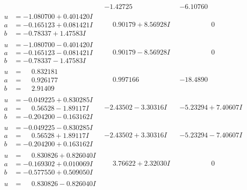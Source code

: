 \documentclass[1p]{elsarticle_modified}
\theoremstyle{definition}
\begin{document}
$$\begin{array}{c|c|c}
 & -1.42725\phantom{ +0.000000I} & -6.10760\phantom{ +0.000000I} \\ \hline\begin{aligned}
u &= -1.080700 + 0.401420 I \\
a &= -0.165123 + 0.081421 I \\
b &= -0.78337 + 1.47583 I\end{aligned}
 & \phantom{-}0.90179 + 8.56928 I & \phantom{-0.000000 } 0 \\ \hline\begin{aligned}
u &= -1.080700 - 0.401420 I \\
a &= -0.165123 - 0.081421 I \\
b &= -0.78337 - 1.47583 I\end{aligned}
 & \phantom{-}0.90179 - 8.56928 I & \phantom{-0.000000 } 0 \\ \hline\begin{aligned}
u &= \phantom{-}0.832181\phantom{ +0.000000I} \\
a &= \phantom{-}0.926177\phantom{ +0.000000I} \\
b &= \phantom{-}2.91409\phantom{ +0.000000I}\end{aligned}
 & \phantom{-}0.997166\phantom{ +0.000000I} & -18.4890\phantom{ +0.000000I} \\ \hline\begin{aligned}
u &= -0.049225 + 0.830285 I \\
a &= \phantom{-}0.56528 - 1.89117 I \\
b &= -0.204200 - 0.163162 I\end{aligned}
 & -2.43502 - 3.30316 I & -5.23294 + 7.40607 I \\ \hline\begin{aligned}
u &= -0.049225 - 0.830285 I \\
a &= \phantom{-}0.56528 + 1.89117 I \\
b &= -0.204200 + 0.163162 I\end{aligned}
 & -2.43502 + 3.30316 I & -5.23294 - 7.40607 I \\ \hline\begin{aligned}
u &= \phantom{-}0.830826 + 0.826040 I \\
a &= -0.169302 + 0.010069 I \\
b &= -0.577550 + 0.509050 I\end{aligned}
 & \phantom{-}3.76622 + 2.32030 I & \phantom{-0.000000 } 0 \\ \hline\begin{aligned}
u &= \phantom{-}0.830826 - 0.826040 I \\

\end{aligned}
\end{array}$$
\end{document}
